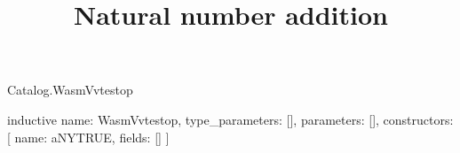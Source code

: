 \begin{lexlean}{Catalog.WasmVvtestop}
\title{Natural number addition}
\begin{semanticmodule}
inductive{
  name: WasmVvtestop,
  type_parameters: [],
  parameters: [],
  constructors: [
    {name: aNYTRUE, fields: []}
  ]
}
\end{semanticmodule}
\end{lexlean}
